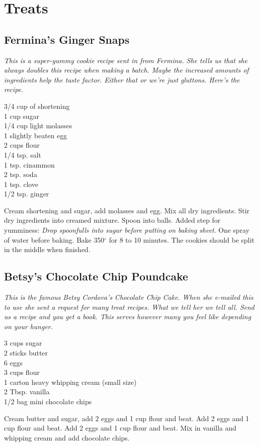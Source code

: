 \chapter{Treats}

\section{Fermina's Ginger Snaps}

\textit{This is a super-yummy cookie recipe sent in from
Fermina.  She tells us that she always doubles this 
recipe when making a batch. Maybe the
increased amounts of ingredients help the taste factor.  Either that or we're
just gluttons.  Here's the recipe.} 
\begin{ingredients}
3/4 cup of shortening \\ 
1 cup sugar \\ 
1/4 cup light molasses \\ 
1 slightly beaten egg \\ 
2 cups flour \\ 
1/4 tsp.  salt \\ 
1 tsp.  cinammon \\ 
2 tsp. soda \\ 
1 tsp.  clove \\ 
1/2 tsp.  ginger
\end{ingredients} 
Cream shortening and sugar, add molasses
and egg.  Mix all dry ingredients.  Stir dry ingredients into creamed mixture. 
Spoon into balls. Added step for yumminess:  \textit{Drop spoonfulls into sugar
before putting on baking sheet}.  One spray of water before baking.  Bake
350$^{\circ}$ for 8 to 10 minutes.  The cookies should be split in the middle
when finished.

\section{Betsy's Chocolate Chip Poundcake}

\textit{This is the famous Betsy Cordova's Chocolate Chip
Cake. When she e-mailed this to use she sent a request for many treat
recipes.  What we tell her we tell all.  Send us a recipe and you get a book.  
This serves however many you feel like depending on your hunger.}
\begin{ingredients}
3 cups sugar \\ 
2 sticks butter \\ 
6 eggs \\
3 cups flour  \\
1 carton heavy whipping cream (small size) \\ 
2 Tbsp.  vanilla \\ 
1/2 bag mini chocolate chips 
\end{ingredients}
Cream butter and sugar, add 2 eggs and 1 cup flour and beat.  Add 2 eggs and 1
cup flour and beat. Add 2 eggs and 1 cup flour and beat.  Mix in vanilla and
whipping cream and add chocolate chips.


